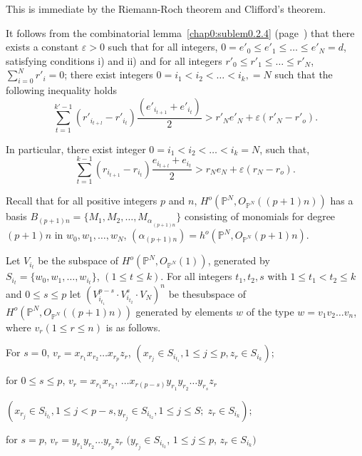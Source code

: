 This is immediate by the Riemann-Roch theorem and Clifford's theorem. 


It follows from the combinatorial lemma~\ref{chap0:sublem0.2.4} 
(page~\pageref{chap0:sublem0.2.4}) that there 
exists a constant $\varepsilon > 0$ such that for all integers, $0 =
e'_0 \le e'_1 \leq \dots \le e'_N = d$, satisfying  conditions i) and
ii) and 
for all integers $r'_0 \le r'_1 \leq \dots \le r'_N$, $\sum\limits_{i=0}^N
r'_i = 0$; there exist integers  $0= i_1 < i_2 < \dots < i_k, = N$
such that the following inequality holds  
$$
\sum_{t=1}^{k'-1}  (r'_{i_{t+l}} - r'_{i_t}) 
\frac{(e'_{i_{t+1}} + e'_{i_t})}{2} >r'_N e'_N + \varepsilon (r'_N -
r'_o). 
$$

\noindent
In particular, there exist integer $ 0=i_1 < i_2 < \dots < i_k = N$,
such that,  
$$\sum\limits_{t=1}^{k-1}  (r_{i_{t+1}}  - r_{i_t}) 
\frac{e_{i_{t+l}} + e_{i_t}}{2} > r_N e_N + \varepsilon (r_N - r_o).
$$

Recall that for all positive integers $p$ and $n$,  $H^o
(\mathbb{P}^N, O_{\mathbb{P}^N} ((p+1)n))$ has a  basis $B_{(p+1)n} =
\{M_1, M_2 ,\ldots, M{_\alpha}_{_{(p+1)n}}\}$ consisting of monomials
for degree $(p+1)n$ in $w_0, w_1,\ldots,w_N$, $(\alpha{_{(p+1)n}}) = h^o
(\mathbb{P}^N, O_{\mathbb{P}^N} (p+1)n)$.\pageoriginale 

\smallskip
Let $V_{i_t}$ be the subspace of $H^o (\mathbb{P}^N, O_{\mathbb{P}^N}
(1))$, generated by \\
$S_{i_t} = \{ w_0, w_1
,\ldots, w_{i_t}\}$, \;  $(1 \le t \le  k)$.  For all integers
$t_1,t_2,s $ with $1 \le t_1 <t_2 \le k$ and $0 \le s \le p$ let
$(V^{p-s}_{i_{t_1}} \cdot V^s_{i_{t_2}} \cdot V_N)^n$ be the\break subspace of
$H^o (\mathbb{P}^N, O_{\mathbb{P}^N}((p+1)n))$ generated by
elements $w$ of the type $w = v_1 v_2 \dots v_n$, where $v_r (1 \le r
\le n)$ is as follows. 

For $ s=0$, $v_r = x_{r_1} x_{r_2} \dots x_{r_p} z_r$,
$(x_{r_j} \in S_{i_{t_1}}, 1 \leq j \leq p, z_r \in
S_{i_k})$;

\noindent
 for $ 0 \le s \le p$, $v_r= x_{r_1} x_{r_2}$, $\ldots
 x_{r(p-s)}  y_{r_1} y_{r_2} \dots y_{r_s} z_r$

\noindent
$
 (x_{r_j} \in S_{i_{t_l}}, 1 \le j < p-s, y_{r_j} \in
 S_{i_{t_2}}, 1 \le j \le S; \; z_r \in  S_{i_k});   
$
 
 \noindent
for $ s=p$, $v_r = y_{r_1} y_{r_2} \dots y_{r_p} z_r $
$(y_{r_j} \in S_{i_{t_2}}$, $1 \le j \le p$, $z_r \in
S_{i_k})$ 

